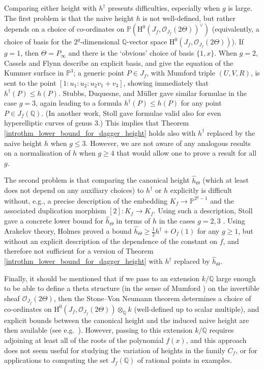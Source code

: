 \documentclass{article} %
\numberwithin{equation}{section}
\renewcommand{\P}{\mathbb{P}}
\renewcommand{\O}{\mathcal{O}}
\newcommand{\HH}{\mathrm{H}}
\newcommand{\cO}{\mathcal{O}}
\newcommand{\Q}{\mathbb{Q}}
\begin{document}
Comparing either height with $h^\dagger$ presents difficulties, especially when $g$ is large. The first problem is that the naive height $h$ is not well-defined, but rather depends on a choice of co-ordinates on $ \P(\HH^0(J_f, \O_{J_f}(2\Theta))^{\vee})$ (equivalently, a choice of basis for the $2^g$-dimensional $\Q$-vector space $\HH^0(J_f, \cO_{J_f}(2 \Theta))$). If $g = 1$, then $\Theta = P_\infty$ and there is the `obvious' choice of basis $\{1, x\}$. When $g = 2$, Cassels and Flynn \cite[Ch. 3]{CasselsFlynnProlegomena} describe an explicit basis, and give the equation of the Kummer surface in $\P^3$; a generic point $P \in J_f$, with Mumford triple $(U, V, R)$, is sent to the point $[1 : u_1 : u_2 : u_2 v_1 + v_3]$, showing immediately that $h^\dagger(P) \leq h(P)$. Stubbs, Duquesne, and M\"uller \cite{Stu00, Duq01, Mul14} gave similar formulae in the case $g = 3$, again leading to a formula $h^\dagger(P) \leq h(P)$ for any point $P \in J_f(\Q)$. (In another work, Stoll \cite{Stoll-heightsgenus3} gave formulae valid also for even hyperelliptic curves of genus 3.) This implies that Theorem \ref{introthm_lower_bound_for_dagger_height} holds also with $h^\dagger$ replaced by the naive height $h$ when $g \leq 3$. However, we are not aware of any analogous results on a normalisation of $h$ when $g \geq 4$ that would allow one to prove a result for all $g$. 

The second problem is that comparing the canonical height $\widehat{h}_\Theta$ (which at least does not depend on any auxiliary choices) to $h^\dagger$ or $h$ explicitly is difficult without, e.g., a precise description of the embedding $K_f \to \P^{2^g-1}$ and the associated duplication morphism $[2] : K_f \to K_f$. Using such a description, Stoll gave a concrete lower bound for $\widehat{h}_\Theta$ in terms of $h$ in the cases $g = 2, 3$ \cite{Sto99, Stoll-heightsgenus3}. Using Arakelov theory, Holmes \cite{holmes-arakelovapproachnaiveheighthyperelliptic} proved a bound $\widehat{h}_\Theta \geq \frac{1}{2} h^\dagger + O_f(1)$ 
for any $g \geq 1$, but without an explicit description of the dependence of the constant on $f$, and therefore not sufficient for a version of Theorem \ref{introthm_lower_bound_for_dagger_height} with $h^\dagger$ replaced by $\widehat{h}_\Theta$.

Finally, it should be mentioned that if we pass to an extension $k / \Q$ large enough to be able to define a theta structure (in the sense of Mumford \cite{Mum66}) on the invertible sheaf $\cO_{J_f}(2 \Theta)$, then the Stone--Von Neumann theorem determines a choice of co-ordinates on $\HH^0(J_f, \cO_{J_f}(2 \Theta)) \otimes_\Q k$ (well-defined up to scalar multiple), and explicit bounds between the canonical height and the induced naive height are then available (see e.g.\ \cite{Zar72, Paz12}). However, passing to this extension $k / \Q$  requires adjoining at least all of the roots of the polynomial $f(x)$, and this approach does not seem useful for studying the variation of heights in the family $C_f$, or for applications to computing the set $J_f(\Q)$ of rational points in examples. 
\end{document}
